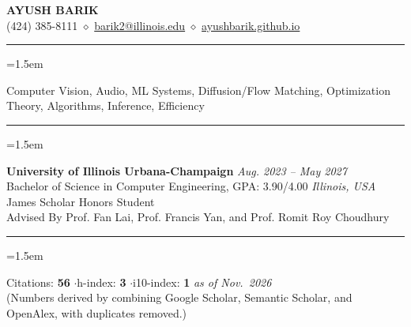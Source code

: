 \documentclass[11pt,letterpaper]{article}
\newcommand{\rsection}[1]{\vspace{7pt}{\bfseries\scshape #1}\par\vspace{-6pt}\rule{\linewidth}{0.6pt}\par\vspace{2pt}}
\newenvironment{rblock}{\begin{list}{}{\leftmargin=1.5em\itemsep=8pt\topsep=2pt}}{\end{list}}
\begin{document}
\begin{center}
  {\LARGE\bfseries AYUSH BARIK}\\[4pt]
  (424) 385-8111 $\diamond$ \href{mailto:barik2@illinois.edu}{barik2@illinois.edu} $\diamond$ \href{https://ayushbarik.github.io}{ayushbarik.github.io}
\end{center}

\rsection{Research Interests}
\begin{rblock}\item Computer Vision, Audio, ML Systems, Diffusion/Flow Matching, Optimization Theory, Algorithms, Inference, Efficiency\end{rblock}

\rsection{Education}
\begin{rblock}\item
  \textbf{University of Illinois Urbana-Champaign} \hfill \textit{Aug. 2023 -- May 2027}\\
  Bachelor of Science in Computer Engineering, GPA: 3.90/4.00 \hfill \textit{Illinois, USA}\\
  James Scholar Honors Student\\
  Advised By Prof. Fan Lai, Prof. Francis Yan, and Prof. Romit Roy Choudhury
\end{rblock}

\rsection{Research Impact}
\begin{rblock}\item
  Citations: \textbf{56} \quad$\cdot$\quad h-index: \textbf{3} \quad$\cdot$\quad i10-index: \textbf{1} \hfill \textit{as of Nov.\ 2026}\\[1pt]
  {\small (Numbers derived by combining Google Scholar, Semantic Scholar, and OpenAlex, with duplicates removed.)}
\end{rblock}
\end{document}

